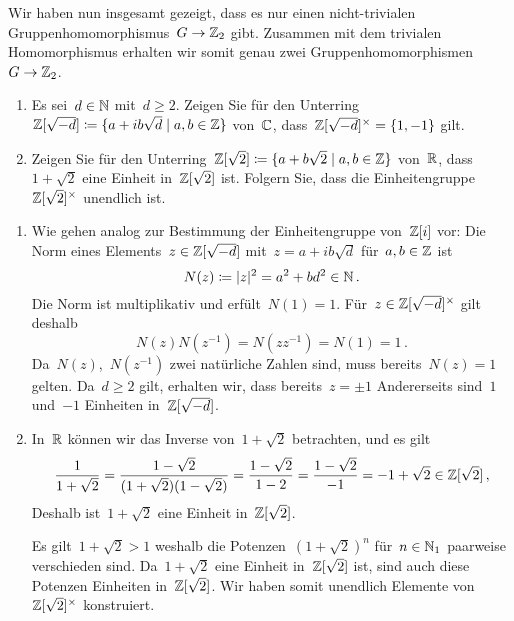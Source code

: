 \documentclass{scrartcl}
\begin{document}
\begin{solution}
\begin{enumerate}
      Wir haben nun insgesamt gezeigt, dass es nur einen nicht-trivialen Gruppenhomomorphismus~$G \to \Integer_2$ gibt.
      Zusammen mit dem trivialen Homomorphismus erhalten wir somit genau zwei Gruppenhomomorphismen~$G \to \Integer_2$.
  \end{enumerate}
\end{solution}

\begin{exercise}
  \leavevmode
  \begin{enumerate}
    \item
      Es sei~$d \in \mathbb{N}$ mit~$d \geq 2$.
      Zeigen Sie für den Unterring~$\Integer[\sqrt{-d}] \defined \{ a + i b \sqrt{d} \suchthat a, b \in \Integer \}$ von~$\mathbb{C}$, dass~$\mathbb{Z}[\sqrt{-d}]^\times = \{1, -1\}$ gilt.
    \item
      Zeigen Sie für den Unterring~$\Integer[\sqrt{2}] \defined \{ a + b \sqrt{2} \suchthat a, b \in \Integer \}$ von~$\mathbb{R}$, dass~$1 + \sqrt{2}$ eine Einheit in~$\mathbb{Z}[\sqrt{2}]$ ist.
      Folgern Sie, dass die Einheitengruppe~$\mathbb{Z}[\sqrt{2}]^\times$ unendlich ist.
  \end{enumerate}
\end{exercise}

\begin{solution}
  \begin{enumerate}
    \item
      Wie gehen analog zur Bestimmung der Einheitengruppe von~$\mathbb{Z}[i]$ vor:
      Die Norm eines Elements~$z \in \mathbb{Z}[\sqrt{-d}]$ mit~$z = a + i b \sqrt{d}$ für~$a, b \in \mathbb{Z}$ ist
      \[
        N(z)
        \coloneqq
        \lvert z\rvert^2
        =
        a^2 + b d^2
        \in 
        \mathbb{N} \,.
      \]
      Die Norm ist multiplikativ und erfült~$N(1) = 1$.
      Für~$z \in \mathbb{Z}[\sqrt{-d}]^\times$ gilt deshalb
      \[
        N(z) N(z^{-1})
        =
        N(z z^{-1})
        =
        N(1)
        =
        1 \,.
      \]
      Da~$N(z)$,~$N(z^{-1})$ zwei natürliche Zahlen sind, muss bereits~$N(z) = 1$ gelten.
      Da~$d \geq 2$ gilt, erhalten wir, dass bereits~$z = \pm 1$
      Andererseits sind~$1$ und~$-1$ Einheiten in~$\mathbb{Z}[\sqrt{-d}]$.
    \item
      In~$\mathbb{R}$ können wir das Inverse von~$1 + \sqrt{2}$ betrachten, und es gilt
      \[
        \frac{1}{1 + \sqrt{2}}
        =
        \frac{ 1 - \sqrt{2} }{ (1 + \sqrt{2}) (1 - \sqrt{2}) }
        =
        \frac{1 - \sqrt{2}}{1 - 2}
        =
        \frac{1 - \sqrt{2}}{-1}
        =
        -1 + \sqrt{2}
        \in
        \mathbb{Z}[\sqrt{2}] \,,
      \]
      Deshalb ist~$1 + \sqrt{2}$ eine Einheit in~$\mathbb{Z}[\sqrt{2}]$.

      Es gilt~$1 + \sqrt{2} > 1$ weshalb die Potenzen~$(1 + \sqrt{2})^n$ für~$n \in \mathbb{N}_1$ paarweise verschieden sind.
      Da~$1 + \sqrt{2}$ eine Einheit in~$\mathbb{Z}[\sqrt{2}]$ ist, sind auch diese Potenzen Einheiten in~$\mathbb{Z}[\sqrt{2}]$.
      Wir haben somit unendlich Elemente von~$\mathbb{Z}[\sqrt{2}]^\times$ konstruiert.
  \end{enumerate}
\end{solution}
\end{document}
